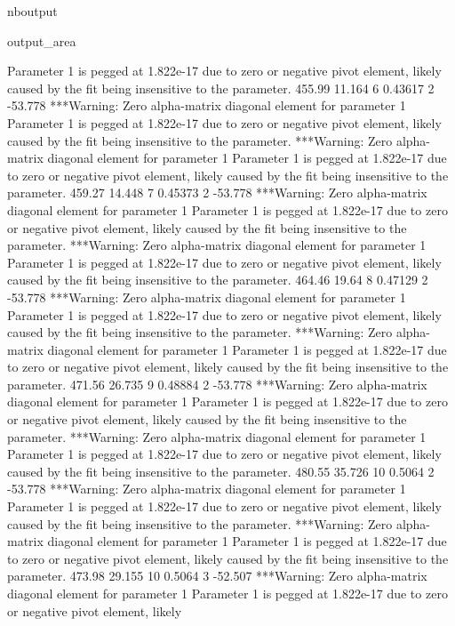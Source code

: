 \documentclass[letterpaper,10pt,english]{sphinxmanual}
\begin{document}
\begin{sphinxuseclass}{nboutput}
{\begin{sphinxuseclass}{output_area}
\begin{sphinxuseclass}{}
\begin{sphinxVerbatim}[commandchars=\\\{\}]
 Parameter 1 is pegged at 1.822e-17 due to zero or negative pivot element, likely
 caused by the fit being insensitive to the parameter.
          455.99      11.164    6     0.43617    2     -53.778
***Warning: Zero alpha-matrix diagonal element for parameter 1
 Parameter 1 is pegged at 1.822e-17 due to zero or negative pivot element, likely
 caused by the fit being insensitive to the parameter.
***Warning: Zero alpha-matrix diagonal element for parameter 1
 Parameter 1 is pegged at 1.822e-17 due to zero or negative pivot element, likely
 caused by the fit being insensitive to the parameter.
          459.27      14.448    7     0.45373    2     -53.778
***Warning: Zero alpha-matrix diagonal element for parameter 1
 Parameter 1 is pegged at 1.822e-17 due to zero or negative pivot element, likely
 caused by the fit being insensitive to the parameter.
***Warning: Zero alpha-matrix diagonal element for parameter 1
 Parameter 1 is pegged at 1.822e-17 due to zero or negative pivot element, likely
 caused by the fit being insensitive to the parameter.
          464.46       19.64    8     0.47129    2     -53.778
***Warning: Zero alpha-matrix diagonal element for parameter 1
 Parameter 1 is pegged at 1.822e-17 due to zero or negative pivot element, likely
 caused by the fit being insensitive to the parameter.
***Warning: Zero alpha-matrix diagonal element for parameter 1
 Parameter 1 is pegged at 1.822e-17 due to zero or negative pivot element, likely
 caused by the fit being insensitive to the parameter.
          471.56      26.735    9     0.48884    2     -53.778
***Warning: Zero alpha-matrix diagonal element for parameter 1
 Parameter 1 is pegged at 1.822e-17 due to zero or negative pivot element, likely
 caused by the fit being insensitive to the parameter.
***Warning: Zero alpha-matrix diagonal element for parameter 1
 Parameter 1 is pegged at 1.822e-17 due to zero or negative pivot element, likely
 caused by the fit being insensitive to the parameter.
          480.55      35.726   10      0.5064    2     -53.778
***Warning: Zero alpha-matrix diagonal element for parameter 1
 Parameter 1 is pegged at 1.822e-17 due to zero or negative pivot element, likely
 caused by the fit being insensitive to the parameter.
***Warning: Zero alpha-matrix diagonal element for parameter 1
 Parameter 1 is pegged at 1.822e-17 due to zero or negative pivot element, likely
 caused by the fit being insensitive to the parameter.
          473.98      29.155   10      0.5064    3     -52.507
***Warning: Zero alpha-matrix diagonal element for parameter 1
 Parameter 1 is pegged at 1.822e-17 due to zero or negative pivot element, likely

\end{sphinxVerbatim}
\end{sphinxuseclass}
\end{sphinxuseclass}}
\end{sphinxuseclass}
\end{document}
